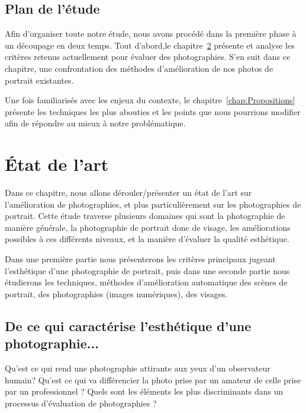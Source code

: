\documentclass[11pt, french,screen]{report-rd-info}
\begin{document}
\section{Plan de l'étude}
Afin d'organiser toute notre étude, nous avons procédé dans la première phase à un découpage en deux temps. Tout d'abord,le chapitre~\ref{chap:EtatArt} présente et analyse les critères retenus actuellement pour évaluer des photographies. S'en suit dans ce chapitre, une confrontation des méthodes d'amélioration de nos photos de portrait existantes.

Une fois familiarisés avec les enjeux du contexte, le chapitre~\ref{chap:Propositions} présente les techniques les plus abouties et les points que nous pourrions modifier afin de répondre au mieux à notre problématique.
\chapter{\'Etat de l'art}
\label{chap:EtatArt}
Dans ce chapitre, nous allons dérouler/présenter un état de l’art sur l’amélioration de photographies, et plus particulièrement sur les photographies de portrait. Cette étude traverse plusieurs domaines qui sont la photographie de manière générale, la photographie de portrait donc de visage, les améliorations possibles à ces différents niveaux, et la manière d’évaluer la qualité esthétique.

Dans une première partie nous présenterons les critères principaux jugeant l’esthétique d’une photographie de portrait, puis dans une seconde partie nous étudierons les techniques, méthodes d’amélioration automatique des scènes de portrait, des photographies (images numériques), des visages.
\section{De ce qui caractérise l’esthétique d’une photographie...}
Qu’est ce qui rend une photographie attirante aux yeux d’un observateur humain? Qu’est ce qui va différencier la photo prise par un amateur de celle prise par un professionnel ? Quels sont les éléments les plus discriminants dans un processus d'évaluation de photographies ?
\end{document}
